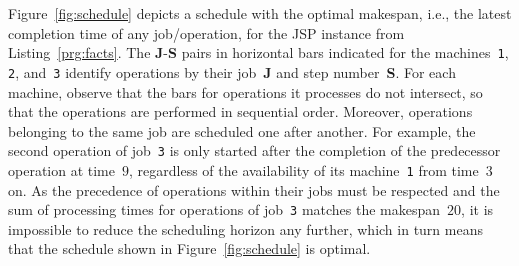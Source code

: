 \documentclass{tlp} %
\begin{document}
Figure~\ref{fig:schedule} depicts a schedule with the optimal makespan, i.e., the latest completion time of any job/operation, for the JSP instance from Listing~\ref{prg:facts}.
The \textbf{J}-\textbf{S} pairs in horizontal bars indicated for the
machines~\lstinline{1}, \lstinline{2}, and~\lstinline{3} identify operations
by their job~\textbf{J} and step number~\textbf{S}.
For each machine, observe that the bars for operations it processes do not
intersect, so that the operations are performed in sequential order.
Moreover, operations belonging to the same job are scheduled one after another.
For example,
the second operation of job~\lstinline{3} is only started after the
completion of the predecessor operation at time~$9$,
regardless of the availability of its machine~\lstinline{1}
from time~$3$ on.
As the precedence of operations within their jobs must be respected
and the sum of processing times for operations of job~\lstinline{3}
matches the makespan~$20$, it is impossible to reduce the scheduling
horizon any further,
which in turn means that the schedule shown in Figure~\ref{fig:schedule} is optimal.
%
\end{document}
